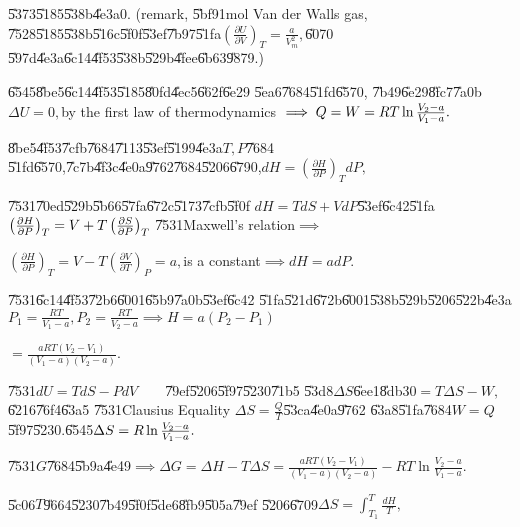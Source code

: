 \documentclass{article}
\begin{document}
\U{5373}\U{5185}\U{538b}\U{4e3a}0. (remark, \U{5bf9}1mol Van der Walls gas,%
\U{7528}\U{5185}\U{538b}\U{516c}\U{5f0f}\U{53ef}\U{7b97}\U{51fa}$\left( 
\frac{\partial U}{\partial V}\right) _{T}=\frac{a}{V_{m}^{2}},$\U{6070}%
\U{597d}\U{4e3a}\U{6c14}\U{4f53}\U{538b}\U{529b}\U{4fee}\U{6b63}\U{9879}.)

\U{6545}\U{8be5}\U{6c14}\U{4f53}\U{5185}\U{80fd}\U{4ec5}\U{662f}\U{6e29}%
\U{5ea6}\U{7684}\U{51fd}\U{6570}, \U{7b49}\U{6e29}\U{8fc7}\U{7a0b}$\Delta
U=0,$by the first law of thermodynamics $\implies Q=W=RT\ln \frac{V_{2}-a}{%
V_{1}-a}.$

\U{8be5}\U{4f53}\U{7cfb}\U{7684}\U{7113}\U{53ef}\U{5199}\U{4e3a}$T,P$\U{7684}%
\U{51fd}\U{6570},\U{7c7b}\U{4f3c}\U{4e0a}\U{9762}\U{7684}\U{5206}\U{6790},$%
dH=\left( \frac{\partial H}{\partial P}\right) _{T}dP,$

\U{7531}\U{70ed}\U{529b}\U{5b66}\U{57fa}\U{672c}\U{5173}\U{7cfb}\U{5f0f}%
\qquad $dH=TdS+VdP$\U{53ef}\U{6c42}\U{51fa}$\left( \frac{\partial H}{%
\partial P}\right) _{T}=V+T\left( \frac{\partial S}{\partial P}\right) _{T}$%
\U{7531}Maxwell's relation$\implies $

$\left( \frac{\partial H}{\partial P}\right) _{T}=V-T\left( \frac{\partial V%
}{\partial T}\right) _{P}=a,$is a constant$\implies dH=adP.$

\U{7531}\U{6c14}\U{4f53}\U{72b6}\U{6001}\U{65b9}\U{7a0b}\U{53ef}\U{6c42}%
\U{51fa}\U{521d}\U{672b}\U{6001}\U{538b}\U{529b}\U{5206}\U{522b}\U{4e3a}$%
P_{1}=\frac{RT}{V_{1}-a},P_{2}=\frac{RT}{V_{2}-a}\implies H=a\left(
P_{2}-P_{1}\right) $

$=\frac{aRT\left( V_{2}-V_{1}\right) }{\left( V_{1}-a\right) \left(
V_{2}-a\right) }.$

\U{7531}\qquad $dU=TdS-PdV\qquad $\U{79ef}\U{5206}\U{5f97}\U{5230}\U{71b5}%
\U{53d8}$\Delta S$\U{6ee1}\U{8db3}$0=T\Delta S-W,$\U{6216}\U{76f4}\U{63a5}%
\U{7531}Clausius Equality $\Delta S=\frac{Q}{T}$\U{53ca}\U{4e0a}\U{9762}%
\U{63a8}\U{51fa}\U{7684}$W=Q$\U{5f97}\U{5230}.\U{6545}$\Delta S=R\ln \frac{%
V_{2}-a}{V_{1}-a}.$

\U{7531}$G$\U{7684}\U{5b9a}\U{4e49}$\implies \Delta G=\Delta H-T\Delta S=%
\frac{aRT\left( V_{2}-V_{1}\right) }{\left( V_{1}-a\right) \left(
V_{2}-a\right) }-RT\ln \frac{V_{2}-a}{V_{1}-a}.$

\U{5c06}$T$\U{9664}\U{5230}\U{7b49}\U{5f0f}\U{5de6}\U{8fb9}\U{505a}\U{79ef}%
\U{5206}\U{6709}$\Delta S=\int_{T_{1}}^{T}\frac{dH}{T},$

\bigskip 

\bigskip 
\end{document}
